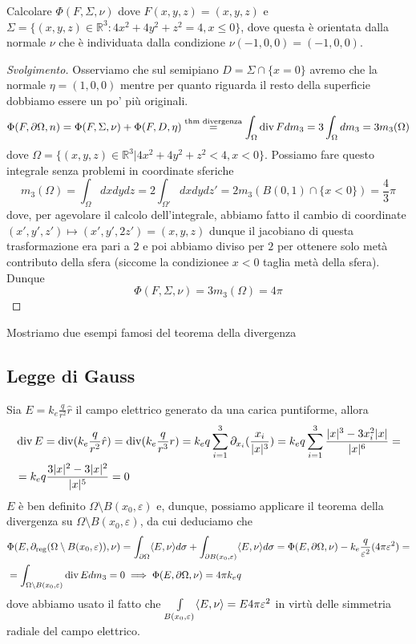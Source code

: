 \begin{example}
	Calcolare $\Phi(F, \Sigma, \nu)$ dove $F(x, y, z)=(x, y, z)$ e $\Sigma=\{(x, y, z) \in \mathbb{R}^3 : 4x^2 + 4y^2 + z^2 = 4, x \leq 0 \}$, dove questa è orientata dalla normale $\nu$ che è individuata dalla condizione
	$\nu(-1, 0, 0) = (-1, 0, 0)$.
\end{example}
\begin{proof}[Svolgimento]
	Osserviamo che sul semipiano $D = \Sigma \cap \{x = 0\}$ avremo che la normale $\eta = (1, 0, 0)$ mentre per quanto riguarda il resto della superficie dobbiamo essere un po' più originali.
	$$
	\Phi(F, \partial \Omega, n) = \Phi(F, \Sigma, \nu) + \Phi(F, D, \eta) \stackrel{\text{thm divergenza}}{=} \int_\Omega \operatorname{div} F dm_3 = 3\int_\Omega dm_3 = 3m_3(\Omega) 
	$$
	dove $\Omega = \{(x, y, z) \in \mathbb{R}^3 | 4x^2 + 4y^2 + z^2 < 4, x < 0 \}$. Possiamo fare questo integrale senza problemi in coordinate sferiche
	$$
	m_3(\Omega) = \int_\Omega dxdydz = 2 \int_{\Omega'} dxdydz' = 2 m_3(B(0, 1) \cap \{ x < 0 \})= \frac{4}{3} \pi 
	$$
	dove, per agevolare il calcolo dell'integrale, abbiamo fatto il cambio di coordinate $(x', y', z') \mapsto (x', y', 2z') = (x, y, z)$ dunque il jacobiano di questa trasformazione era pari a $2$ e poi abbiamo diviso per $2$ per ottenere solo metà contributo della sfera (siccome la condizionee $x<0$ taglia metà della sfera).
	Dunque
	$$
	\Phi(F, \Sigma, \nu) = 3m_3(\Omega) = 4\pi
	$$
\end{proof}
Mostriamo due esempi famosi del teorema della divergenza
\subsection{Legge di Gauss}
Sia $E = k_e \frac{q}{r^2}\hat{r}$ il campo elettrico generato da una carica puntiforme, allora
\begin{align*}
&\operatorname{div} E = \operatorname{div}(k_e \frac{q}{r^2} \hat{r}) = \operatorname{div}(k_e \frac{q}{r^3}r) = k_e q \sum_{i=1}^3 \partial_{x_i} (\frac{x_i}{|x|^3}) = k_e q \sum_{i=1}^3 \frac{|x|^3 - 3 x_i^2 |x|}{|x|^6} = \\
&=k_e q \frac{3|x|^2 - 3 |x|^2}{|x|^5} = 0
\end{align*}
$E$ è ben definito $\Omega \setminus B(x_0, \varepsilon)$ e, dunque, possiamo applicare il teorema della divergenza su $\Omega \setminus B(x_0, \varepsilon)$, da cui deduciamo che
\begin{align*}
&\Phi(E, \partial_{\text{reg}} (\Omega \setminus B(x_0, \varepsilon)), \nu) = \int_{\partial \Omega} \langle E, \nu \rangle d\sigma + \int_{\partial B(x_0, \varepsilon)} \langle E, \nu \rangle d\sigma = \Phi(E, \partial \Omega, \nu) - k_e \frac{q}{\varepsilon^2} (4 \pi \varepsilon^2) = \\
&=\int_{\Omega \setminus B(x_0, \varepsilon)} \operatorname{div} E dm_3 = 0 \implies \Phi(E, \partial \Omega, \nu) = 4 \pi k_e q
\end{align*}
dove abbiamo usato il fatto che $\int\limits_{B(x_0, \varepsilon)} \langle E, \nu \rangle = E 4 \pi \varepsilon^2$ in virtù delle simmetria radiale del campo elettrico.
